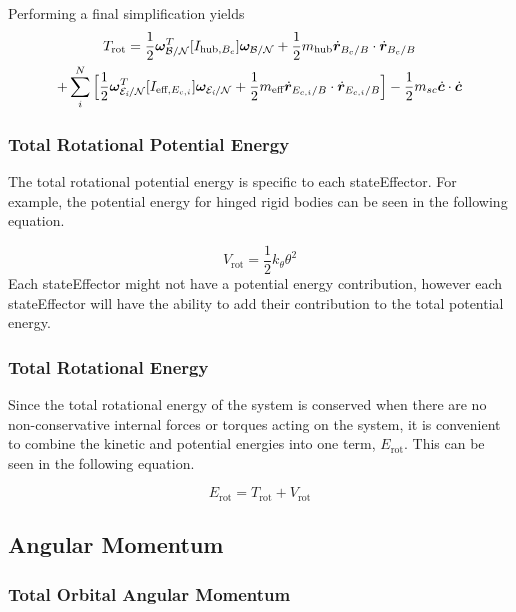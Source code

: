 Performing a final simplification yields
\begin{multline}
T_{\text{rot}} = \frac{1}{2} \bm \omega_{\cal{B/N}}^T [I_{\text{hub},B_c}] \bm \omega_{\cal{B/N}} + \frac{1}{2} m_{\text{hub}} \dot{\bm r}_{B_c/B}\cdot\dot{\bm r}_{B_c/B} \\
+ \sum\limits_{i}^{N}\Big[\frac{1}{2} \bm \omega_{\cal{E}_{\textit{i}}/\cal{N}}^T [I_{\text{eff},E_{c,i}}] \bm \omega_{\cal{E}_{\textit{i}}/\cal{N}}
+ \frac{1}{2} m_{\text{eff}}\dot{\bm r}_{E_{c,i}/B} \cdot \dot{\bm r}_{E_{c,i}/B} \Big]
- \frac{1}{2} m_{sc}\dot{\bm c} \cdot \dot{\bm c}
\end{multline}

\subsubsection{Total Rotational Potential Energy}

The total rotational potential energy is specific to each stateEffector. For example, the potential energy for hinged rigid bodies can be seen in the following equation.

\begin{equation}
V_{\text{rot}} = \frac{1}{2}k_{\theta} \theta^2
\end{equation}
Each stateEffector might not have a potential energy contribution, however each stateEffector will have the ability to add their contribution to the total potential energy.

\subsubsection{Total Rotational Energy}

Since the total rotational energy of the system is conserved when there are no non-conservative internal forces or torques acting on the system, it is convenient to combine the kinetic and potential energies into one term, $E_{\text{rot}}$. This can be seen in the following equation.

\begin{equation}
E_{\text{rot}} = T_{\text{rot}} + V_{\text{rot}}
\end{equation}

\subsection{Angular Momentum}

\subsubsection{Total Orbital Angular Momentum}

